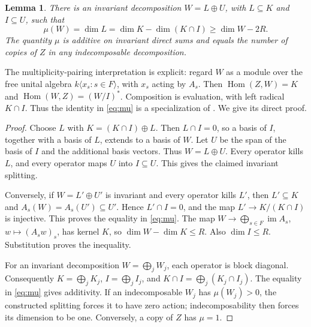 \documentclass[11pt]{article}
\newtheorem{lemma}[theorem]{Lemma}
\newcommand{\im}{\operatorname{im}}
\begin{document}
\begin{lemma}\label{lem:split}
There is an invariant decomposition \(W=L\oplus U\), with \(L\subseteq K\)
and \(I\subseteq U\), such that
\begin{equation}\label{eq:mu}
 \mu(W)=\dim L=\dim K-\dim(K\cap I)\geq\dim W-2R.
\end{equation}
The quantity \(\mu\) is additive on invariant direct sums and equals the number
of copies of \(Z\) in any indecomposable decomposition.
\end{lemma}
The multiplicity-pairing interpretation is explicit: regard \(W\) as a module
over the free unital algebra \(k\langle x_s:s\in F\rangle\), with \(x_s\)
acting by \(A_s\). Then
\(\operatorname{Hom}(Z,W)=K\) and
\(\operatorname{Hom}(W,Z)=(W/I)^*\).
Composition is evaluation, with left radical \(K\cap I\). Thus the identity
in \eqref{eq:mu} is a specialization of \cite{JMW}. We give its direct proof.
\begin{proof}
Choose \(L\) with \(K=(K\cap I)\oplus L\). Then \(L\cap I=0\), so a basis of
\(I\), together with a basis of \(L\), extends to a basis of \(W\).
Let \(U\) be the span of the basis of \(I\) and the additional basis vectors.
Thus \(W=L\oplus U\). Every operator kills \(L\), and every operator maps
\(U\) into \(I\subseteq U\). This gives the claimed invariant splitting.

Conversely, if \(W=L'\oplus U'\) is invariant and every operator kills \(L'\),
then \(L'\subseteq K\) and \(A_s(W)=A_s(U')\subseteq U'\). Hence
\(L'\cap I=0\), and the map \(L'\to K/(K\cap I)\) is injective. This proves
the equality in \eqref{eq:mu}. The map
\(W\to\bigoplus_{s\in F}\im A_s\), \(w\mapsto(A_sw)_s\), has kernel \(K\),
so \(\dim W-\dim K\leq R\). Also \(\dim I\leq R\). Substitution proves
the inequality.

For an invariant decomposition \(W=\bigoplus_jW_j\), each operator is block
diagonal. Consequently \(K=\bigoplus_jK_j\), \(I=\bigoplus_jI_j\), and
\(K\cap I=\bigoplus_j(K_j\cap I_j)\). The equality in \eqref{eq:mu} gives
additivity. If an indecomposable \(W_j\) has \(\mu(W_j)>0\), the constructed
splitting forces it to have zero action; indecomposability then forces its
dimension to be one. Conversely, a copy of \(Z\) has \(\mu=1\).
\end{proof}
\end{document}

